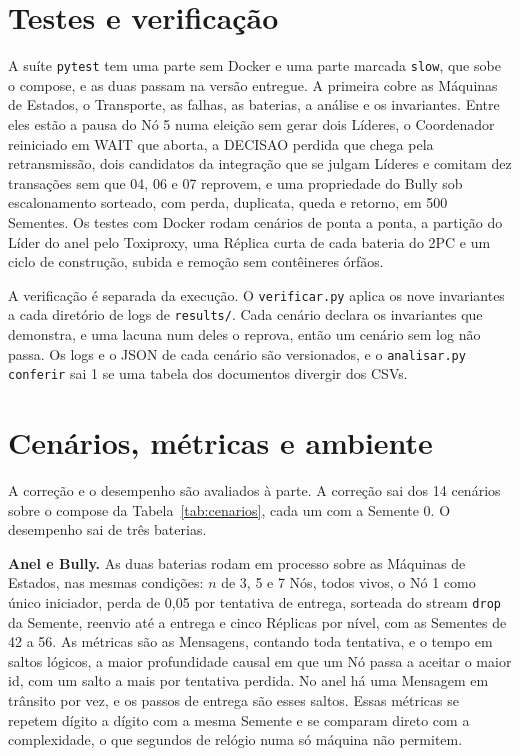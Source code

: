 \documentclass[conference]{IEEEtran}
\newcommand{\cod}[1]{\texttt{\upshape #1}}
\begin{document}
\section{Testes e verificação}
\label{sec:testes}
A suíte \cod{pytest} tem uma parte sem Docker e uma parte marcada \cod{slow}, que sobe o compose,
e as duas passam na versão entregue. A primeira cobre as Máquinas de Estados, o Transporte, as falhas, as baterias, a análise e os
invariantes. Entre eles
estão a pausa do Nó 5 numa eleição sem gerar dois Líderes, o Coordenador reiniciado em WAIT que aborta, a DECISAO perdida que chega pela
retransmissão, dois candidatos da integração que se julgam Líderes
e comitam dez transações sem que 04, 06 e 07 reprovem, e uma propriedade do Bully sob escalonamento
sorteado, com perda, duplicata, queda e retorno, em 500 Sementes. Os testes com Docker rodam
cenários de ponta a ponta, a partição do Líder do anel pelo Toxiproxy, uma Réplica curta de
cada bateria do 2PC e um ciclo de construção, subida e remoção sem contêineres órfãos.

A verificação é separada da execução. O \cod{verificar.py} aplica os nove invariantes a cada
diretório de logs de \cod{results/}. Cada cenário declara os invariantes que demonstra, e uma
lacuna num deles o reprova, então um cenário sem log não passa. Os logs e o JSON de cada cenário são
versionados, e o \cod{analisar.py conferir} sai 1 se uma tabela dos documentos divergir dos CSVs.

\section{Cenários, métricas e ambiente}
\label{sec:metodo}
A correção e o desempenho são avaliados à parte. A correção sai dos 14 cenários sobre o compose da
Tabela~\ref{tab:cenarios}, cada um com a Semente 0. O desempenho sai de três baterias.

\textbf{Anel e Bully.} As duas baterias rodam em processo sobre as Máquinas de Estados, nas mesmas
condições: $n$ de 3, 5 e 7 Nós, todos vivos, o Nó 1 como único iniciador, perda de 0,05 por
tentativa de entrega, sorteada do stream \cod{drop} da Semente, reenvio até a entrega e cinco
Réplicas por nível, com as Sementes de 42 a 56. As métricas são as Mensagens, contando toda
tentativa, e o tempo em saltos lógicos, a maior profundidade causal em que um Nó passa a aceitar o
maior id, com um salto a mais por tentativa perdida. No anel há uma Mensagem em trânsito por vez, e
os passos de entrega são esses saltos. Essas métricas se repetem dígito a dígito com a mesma Semente
e se comparam direto com a complexidade, o que
segundos de relógio numa só máquina não permitem.
\end{document}
